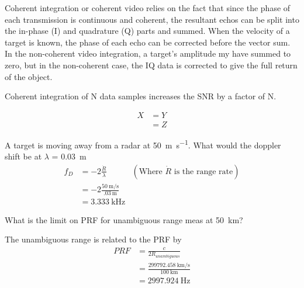 \documentclass[12pt]{article}
\newenvironment{exercise}[2][Exercise]{\begin{trivlist}
    \item[\hskip \labelsep {\bfseries #1}\hskip \labelsep {\bfseries #2.}]}{\end{trivlist}}
\begin{document}
\begin{exercise}{9}
      Coherent integration or coherent video relies on the fact that since the phase of each transmission is continuous and coherent, the resultant echos can be split into the in-phase (I) and quadrature (Q) parts and summed.  When the velocity of a target is known, the phase of each echo can be corrected before the vector sum.  In the non-coherent video integration, a target's amplitude my have summed to zero, but in the non-coherent case, the IQ data is corrected to give the full return of the object. 

      Coherent integration of N data samples increases the SNR by a factor of N.


      \begin{align*}
      X & = Y\\
      & = Z
      \end{align*}
      \end{exercise}
      
      \begin{exercise}{10}
      A target is moving away from a radar at \SI{50}{\meter\per\second}. What would the doppler shift be at $\lambda$ = \SI{.03}{\meter}
      \begin{align*}
      f_{D} & = -2\frac{\dot{R}}{\lambda} & (\text{Where $\dot{R}$ is the range rate})\\
      & = -2\frac{\SI{50}{\meter\per\second}}{\SI{.03}{\meter}}\\
      & = \SI{3.333}{\kHz}
      \end{align*}
      \end{exercise}
      
      \begin{exercise}{11}
      What is the limit on PRF for unambiguous range meas at \SI{50}{\km}?

      The unambiguous range is related to the PRF by
      \begin{align*}
      PRF & = \frac{c}{2 R_{unambiguous}}\\
      & = \frac{\SI{299792.458}{\km\per\second}}{\SI{100}{\km}}\\
      & = \SI{2997.924}{\Hz}
      \end{align*}
      \end{exercise}
      
\end{document}
